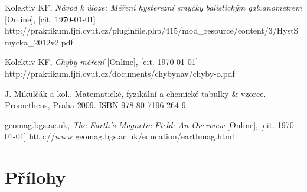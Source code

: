 \documentclass[english]{article}
\begin{document}
\begin{thebibliography}{9}
 Kolektiv KF, \emph{Návod k úloze: Měření hysterezní smyčky balistickým galvanometrem} [Online], [cit. \today] \newline http://praktikum.fjfi.cvut.cz/pluginfile.php/415/mod\_resource/content/3/HystSmycka\_2012v2.pdf



 Kolektiv KF, \emph{Chyby měření} [Online], [cit. \today] \newline http://praktikum.fjfi.cvut.cz/documents/chybynav/chyby-o.pdf


 J. Mikulčák a kol., Matematické, fyzikální a chemické tabulky \& vzorce. Prometheus,
Praha 2009.\newline
ISBN 978-80-7196-264-9



 geomag.bgs.ac.uk, \emph{The Earth's Magnetic Field: An Overview} [Online], [cit. \today] \newline http://www.geomag.bgs.ac.uk/education/earthmag.html

\end{thebibliography}
\endgroup
\setcounter{equation}{0}
\part*{Přílohy}
\end{document}
